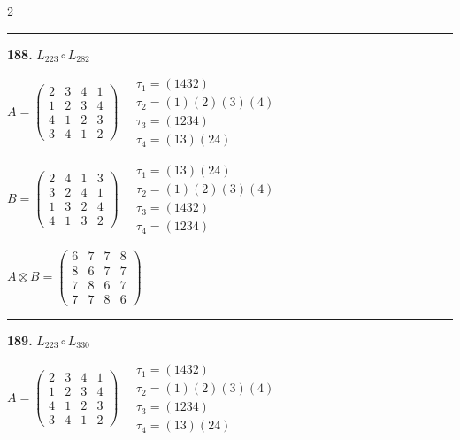 \begin{multicols}{2}
\vspace{0.3em}
\hrule
\vspace{0.3em}

\noindent\textbf{188.} $L_{223} \circ L_{282}$

$A = \begin{pmatrix} 2 & 3 & 4 & 1 \\ 1 & 2 & 3 & 4 \\ 4 & 1 & 2 & 3 \\ 3 & 4 & 1 & 2 \end{pmatrix} \quad \begin{matrix} \tau_{1}=(1 4 3 2) \\ \tau_{2}=(1)(2)(3)(4) \\ \tau_{3}=(1 2 3 4) \\ \tau_{4}=(1 3)(2 4) \end{matrix}$

$B = \begin{pmatrix} 2 & 4 & 1 & 3 \\ 3 & 2 & 4 & 1 \\ 1 & 3 & 2 & 4 \\ 4 & 1 & 3 & 2 \end{pmatrix} \quad \begin{matrix} \tau_{1}=(1 3)(2 4) \\ \tau_{2}=(1)(2)(3)(4) \\ \tau_{3}=(1 4 3 2) \\ \tau_{4}=(1 2 3 4) \end{matrix}$

$A \otimes B = \begin{pmatrix} 6 & 7 & 7 & 8 \\ 8 & 6 & 7 & 7 \\ 7 & 8 & 6 & 7 \\ 7 & 7 & 8 & 6 \end{pmatrix}$

\vspace{0.3em}
\hrule
\vspace{0.3em}

\noindent\textbf{189.} $L_{223} \circ L_{330}$

$A = \begin{pmatrix} 2 & 3 & 4 & 1 \\ 1 & 2 & 3 & 4 \\ 4 & 1 & 2 & 3 \\ 3 & 4 & 1 & 2 \end{pmatrix} \quad \begin{matrix} \tau_{1}=(1 4 3 2) \\ \tau_{2}=(1)(2)(3)(4) \\ \tau_{3}=(1 2 3 4) \\ \tau_{4}=(1 3)(2 4) \end{matrix}$


\end{multicols}
